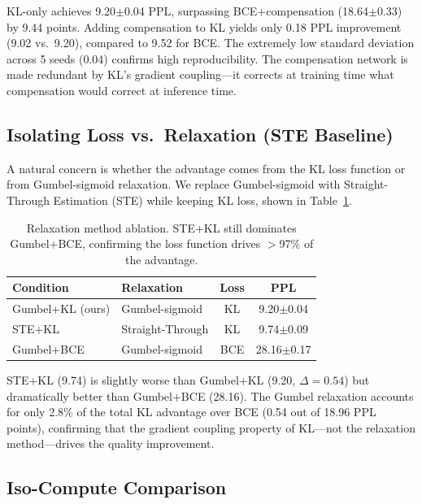 \documentclass[11pt,a4paper]{article}
\begin{document}
KL-only achieves 9.20$\pm$0.04 PPL, surpassing BCE+compensation (18.64$\pm$0.33) by 9.44 points.
Adding compensation to KL yields only 0.18 PPL improvement (9.02 vs.\ 9.20), compared to 9.52 for BCE.
The extremely low standard deviation across 5 seeds (0.04) confirms high reproducibility.
The compensation network is made redundant by KL's gradient coupling---it corrects at training time what compensation would correct at inference time.

\subsection{Isolating Loss vs.\ Relaxation (STE Baseline)}
\label{sec:ste}

A natural concern is whether the advantage comes from the KL loss function or from Gumbel-sigmoid relaxation.
We replace Gumbel-sigmoid with Straight-Through Estimation (STE) while keeping KL loss, shown in Table~\ref{tab:ste}.

\begin{table}[t]
\centering
\small
\caption{Relaxation method ablation. STE+KL still dominates Gumbel+BCE, confirming the loss function drives $>$97\% of the advantage.}
\label{tab:ste}
\begin{tabular}{llcc}
\toprule
\textbf{Condition} & \textbf{Relaxation} & \textbf{Loss} & \textbf{PPL} \\
\midrule
Gumbel+KL (ours) & Gumbel-sigmoid & KL & 9.20\small{$\pm$0.04} \\
STE+KL & Straight-Through & KL & 9.74\small{$\pm$0.09} \\
Gumbel+BCE & Gumbel-sigmoid & BCE & 28.16\small{$\pm$0.17} \\
\bottomrule
\end{tabular}
\end{table}

STE+KL (9.74) is slightly worse than Gumbel+KL (9.20, $\Delta = 0.54$) but dramatically better than Gumbel+BCE (28.16).
The Gumbel relaxation accounts for only 2.8\% of the total KL advantage over BCE (0.54 out of 18.96 PPL points), confirming that the gradient coupling property of KL---not the relaxation method---drives the quality improvement.

\subsection{Iso-Compute Comparison}
\label{sec:isocompute}
\end{document}
